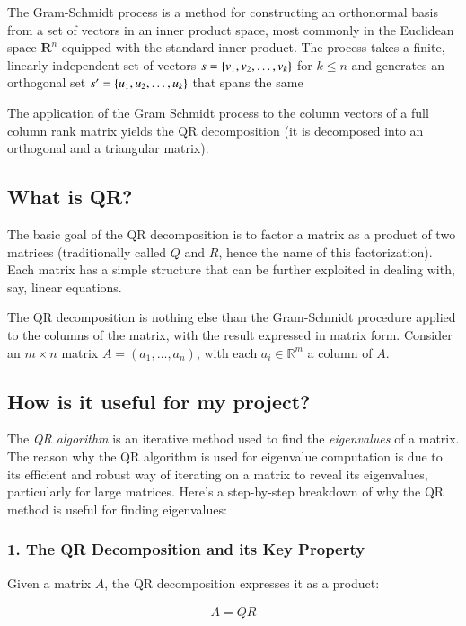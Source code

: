 \documentclass[article]{IEEEtran}
\numberwithin{equation}{enumi}
\numberwithin{figure}{enumi}
\begin{document}
The Gram-Schmidt process is a method for constructing an orthonormal basis from a set of vectors in an inner product space, most commonly in the Euclidean space $\mathbf{R}^n$ equipped with the standard inner product. The process takes a finite, linearly independent set of vectors $s = \left\{v_1, v_2, \dots, v_k\right\}$ for $k \leq n$ and generates an orthogonal set $ s^{\prime} = \left\{u_1, u_2, \dots, u_k\right\}$ that spans the same 

The application of the Gram Schmidt process to the column vectors of a full column rank matrix yields the QR decomposition (it is decomposed into an orthogonal and a triangular matrix).

\subsection{What is QR?}
The basic goal of the QR decomposition is to factor a matrix as a product of two matrices (traditionally called $ Q $ and $ R $, hence the name of this factorization). Each matrix has a simple structure that can be further exploited in dealing with, say, linear equations.

The QR decomposition is nothing else than the Gram-Schmidt procedure applied to the columns of the matrix, with the result expressed in matrix form. Consider an $m \times n$ matrix $A = (a_1, \ldots, a_n)$, with each $a_i \in \mathbb{R}^m$ a column of $A$.

\subsection{How is it useful for my project?}
The \textit{QR algorithm} is an iterative method used to find the \textit{eigenvalues} of a matrix. The reason why the QR algorithm is used for eigenvalue computation is due to its efficient and robust way of iterating on a matrix to reveal its eigenvalues, particularly for large matrices. Here's a step-by-step breakdown of why the QR method is useful for finding eigenvalues:

\subsubsection{1. The QR Decomposition and its Key Property}
Given a matrix $A$, the QR decomposition expresses it as a product:

\begin{align*}
\boxed{A = QR}
\end{align*}
\end{document}
